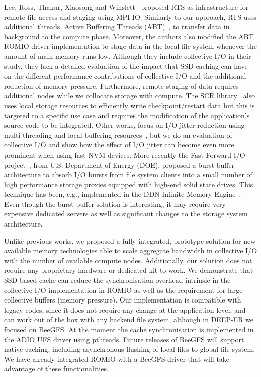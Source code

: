 Lee, Ross, Thakur, Xiaosong and Winslett~\cite{LeeRTXW04} proposed RTS as infrastructure for remote file access and staging using MPI-IO. Similarly to our approach, RTS uses additional threads, Active Buffering Threads (ABT)~\cite{XiaosongWLS03}, to 
transfer data in background to the compute phase. Moreover, the authors also modified the ABT ROMIO driver implementation to stage data in the local file system whenever the amount of main memory runs low. Although they include collective I/O in their 
study, they lack a detailed evaluation of the impact that SSD caching can have on the different performance contributions of collective I/O and the additional reduction of memory pressure. Furthermore, remote staging of data requires additional nodes 
while we collocate storage with compute. The SCR library~\cite{SCR} also uses local storage resources to efficiently write checkpoint/restart data but this is targeted to a specific use case and requires the modification of the application's source 
code to be integrated. Other works, focus on I/O jitter reduction using multi-threading and local buffering resources~\cite{DorierACSO12}, but we do an evaluation of collective I/O and show how the effect of I/O jitter can become even more prominent 
when using fast NVM devices. More recently the Fast Forward I/O project~\cite{fastforward}, from U.S. Department of Energy (DOE), proposed a burst buffer architecture to absorb I/O bursts from file system clients into a small number of high performance 
storage proxies equipped with high-end solid state drives. This technique has been, e.g., implemented in the DDN Infinite Memory Engine~\cite{DDN}. Even though the burst buffer solution is interesting, it may require very expensive dedicated servers as 
well as significant changes to the storage system architecture. 

Unlike previous works, we proposed a fully integrated, prototype solution for new available memory technologies able to scale aggregate bandwidth in collective I/O with the number of available compute nodes. Additionally, our solution does not require 
any proprietary hardware or dedicated kit to work. We demonstrate that SSD based cache can reduce the synchronisation overhead intrinsic in the collective I/O implementation in ROMIO as well as the requirement for large collective buffers 
(memory pressure). Our implementation is compatible with legacy codes, since it does not require any change at the application level, and can work out of the box with any backend file system, although in DEEP-ER we focused on BeeGFS. At the 
moment the cache synchronisation is implemented in the ADIO UFS driver using pthreads. Future releases of BeeGFS will support native caching, including asynchronous flushing of local files to global file system. We have already integrated ROMIO 
with a BeeGFS driver that will take advantage of these functionalities.
